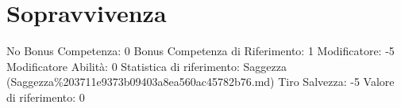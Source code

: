 \section{Sopravvivenza}\label{sopravvivenza}

\begin{description}
\tightlist
\item[Tags: ABI]
No Bonus Competenza: 0 Bonus Competenza di Riferimento: 1 Modificatore:
-5 Modificatore Abilità: 0 Statistica di riferimento: Saggezza
(Saggezza\%203711e9373b09403a8ea560ac45782b76.md) Tiro Salvezza: -5
Valore di riferimento: 0
\end{description}
